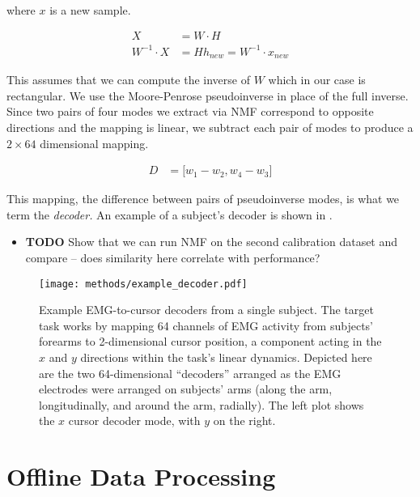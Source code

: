 \documentclass[../main.tex]{subfiles}
\begin{document}
\begin{align}
\end{align}

where $x$ is a new sample.

\begin{align}
  X &= W\cdot{H} \\
  W^{-1}\cdot{X} &= {H}
  h_{new} = W^{-1}\cdot{x_{new}}
\end{align}

This assumes that we can compute the inverse of $W$ which in our case is rectangular. We use the Moore-Penrose pseudoinverse in place of the full inverse. Since two pairs of four modes we extract via NMF correspond to opposite directions and the mapping is linear, we subtract each pair of modes to produce a $2\times{64}$ dimensional mapping.

\begin{align}
  D &= \lbrack w_1 - w_2, w_4 - w_3 \rbrack
\end{align}

This mapping, the difference between pairs of pseudoinverse modes, is what we term the \textit{decoder.} An example of a subject's decoder is shown in .

\begin{itemize}
  \item \textbf{TODO} Show that we can run NMF on the second calibration dataset and compare – does similarity here correlate with performance?
\end{itemize}

\begin{figure}[tph]
  \centering
  \texttt{[image: methods/example\_decoder.pdf]}
  \caption[Example subject decoder]{Example EMG-to-cursor decoders from a single subject. The target task works by mapping 64 channels of EMG activity from subjects' forearms to 2-dimensional cursor position, a component acting in the $x$ and $y$ directions within the task's linear dynamics. Depicted here are the two 64-dimensional ``decoders'' arranged as the EMG electrodes were arranged on subjects' arms (along the arm, longitudinally, and around the arm, radially). The left plot shows the $x$ cursor decoder mode, with $y$ on the right.}\label{fig:example_decoder}
\end{figure}




\section{Offline Data Processing}
\end{document}
